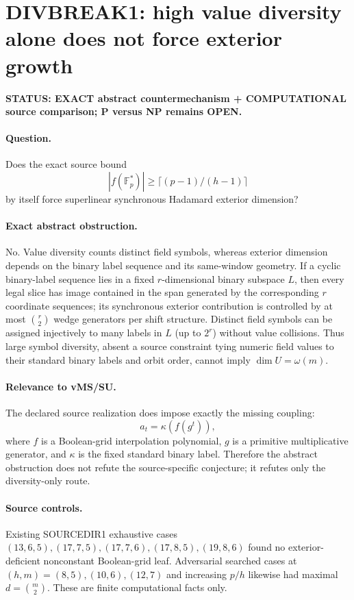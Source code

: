 \documentclass[11pt]{article}\usepackage[margin=.88in]{geometry}\usepackage{amsmath,amssymb}
\begin{document}
\section*{DIVBREAK1: high value diversity alone does not force exterior growth}
\textbf{STATUS: EXACT abstract countermechanism + COMPUTATIONAL source comparison; P versus NP remains OPEN.}
\paragraph{Question.} Does the exact source bound
\[
|f(\mathbb F_p^*)|\ge\lceil(p-1)/(h-1)\rceil
\]
by itself force superlinear synchronous Hadamard exterior dimension?
\paragraph{Exact abstract obstruction.}
No. Value diversity counts distinct field symbols, whereas exterior dimension depends on the binary label sequence and its same-window geometry. If a cyclic binary-label sequence lies in a fixed \(r\)-dimensional binary subspace \(L\), then every legal slice has image contained in the span generated by the corresponding \(r\) coordinate sequences; its synchronous exterior contribution is controlled by at most \(\binom r2\) wedge generators per shift structure. Distinct field symbols can be assigned injectively to many labels in \(L\) (up to \(2^r\)) without value collisions. Thus large symbol diversity, absent a source constraint tying numeric field values to their standard binary labels and orbit order, cannot imply \(\dim U=\omega(m)\).
\paragraph{Relevance to vMS/SU.}
The declared source realization does impose exactly the missing coupling:
\[
a_t=\kappa(f(g^t)),
\]
where \(f\) is a Boolean-grid interpolation polynomial, \(g\) is a primitive multiplicative generator, and \(\kappa\) is the fixed standard binary label. Therefore the abstract obstruction does not refute the source-specific conjecture; it refutes only the diversity-only route.
\paragraph{Source controls.}
Existing SOURCEDIR1 exhaustive cases \((13,6,5),(17,7,5),(17,7,6),(17,8,5),(19,8,6)\) found no exterior-deficient nonconstant Boolean-grid leaf. Adversarial searched cases at \((h,m)=(8,5),(10,6),(12,7)\) and increasing \(p/h\) likewise had maximal \(d=\binom m2\). These are finite computational facts only.
\end{document}
